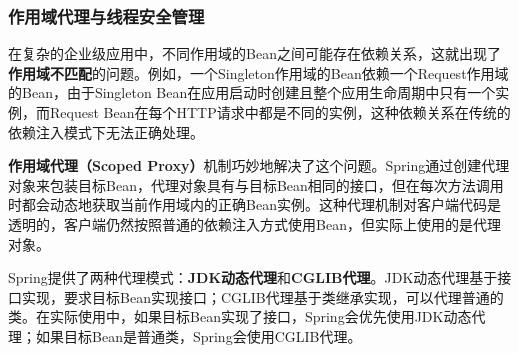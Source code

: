 \subsubsection{作用域代理与线程安全管理}\label{ux4f5cux7528ux57dfux4ee3ux7406ux4e0eux7ebfux7a0bux5b89ux5168ux7ba1ux7406}

在复杂的企业级应用中，不同作用域的Bean之间可能存在依赖关系，这就出现了\textbf{作用域不匹配}的问题。例如，一个Singleton作用域的Bean依赖一个Request作用域的Bean，由于Singleton Bean在应用启动时创建且整个应用生命周期中只有一个实例，而Request Bean在每个HTTP请求中都是不同的实例，这种依赖关系在传统的依赖注入模式下无法正确处理。

\textbf{作用域代理（Scoped Proxy）}机制巧妙地解决了这个问题。Spring通过创建代理对象来包装目标Bean，代理对象具有与目标Bean相同的接口，但在每次方法调用时都会动态地获取当前作用域内的正确Bean实例。这种代理机制对客户端代码是透明的，客户端仍然按照普通的依赖注入方式使用Bean，但实际上使用的是代理对象。

Spring提供了两种代理模式：\textbf{JDK动态代理}和\textbf{CGLIB代理}。JDK动态代理基于接口实现，要求目标Bean实现接口；CGLIB代理基于类继承实现，可以代理普通的类。在实际使用中，如果目标Bean实现了接口，Spring会优先使用JDK动态代理；如果目标Bean是普通类，Spring会使用CGLIB代理。

